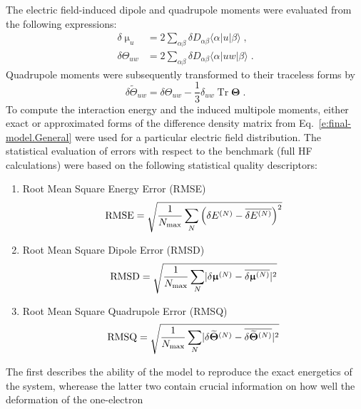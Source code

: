 \documentclass[aip,amsmath,amssymb,reprint]{revtex4-1}
\newcommand{\tbraket}[3]{\ensuremath{\bigl\langle {#1} \bigl\lvert {#2} \bigl\lvert {#3} \bigr\rangle}}
\newcommand{\BM}[1]{\bm{#1}}
\DeclareMathOperator{\Tr}{Tr}
\begin{document}
The electric field\hyp{}induced dipole and quadrupole moments were evaluated from the following expressions:
%
\begin{subequations}\label{e:dmult}
  \begin{align}
   \delta \upmu_{u}   &= 2\sum_{\alpha\beta} \delta D_{\alpha\beta} \tbraket{\alpha}{u}{\beta}  \;,\\
   \delta \Theta_{uw} &= 2\sum_{\alpha\beta} \delta D_{\alpha\beta} \tbraket{\alpha}{uw}{\beta} \;. 
  \end{align}
\end{subequations}
%
Quadrupole moments were subsequently transformed to their traceless forms by
%
\begin{equation}
  \delta \widetilde{\Theta}_{uw} = \delta \Theta_{uw} - \frac{1}{3} \delta_{uw} \Tr{\BM\Theta} \;.
\end{equation}
%
To compute the interaction energy and the induced multipole moments, either exact or approximated forms
of the difference density matrix from Eq.~\eqref{e:final-model.General}
were used for a particular electric field distribution. The statistical evaluation of
errors with respect to the benchmark (full HF calculations) were based on 
the following statistical quality descriptors:
%
\begin{enumerate}
 \item Root Mean Square Energy Error (RMSE)
   \begin{equation}\label{e:rmse}
     {\rm RMSE} = \sqrt{ \frac{1}{N_{\rm max}} \sum_N \left( \delta E^{(N)} - \overline{\delta E^{(N)}}\right)^2 }
   \end{equation}
 \item Root Mean Square Dipole Error (RMSD)
   \begin{equation}\label{e:rmsd}
     {\rm RMSD} = \sqrt{ \frac{1}{N_{\rm max}}\sum_N \lvert \delta {\BM\upmu}^{(N)} - \overline{\delta {\BM\upmu}^{(N)}}\rvert^2 }
   \end{equation}
 \item Root Mean Square Quadrupole Error (RMSQ)
   \begin{equation}\label{e:rmsq}
     {\rm RMSQ} = \sqrt{ \frac{1}{N_{\rm max}}\sum_N \lvert \delta \widetilde{\BM\Theta}^{(N)} - \overline{\delta \widetilde{\BM\Theta}^{(N)}}\rvert^2 }
   \end{equation}
\end{enumerate}
%
The first describes the ability of the model to reproduce the exact energetics of the system, 
wherease the latter two contain crucial information on how well the deformation of the one\hyp{}electron
\end{document}
